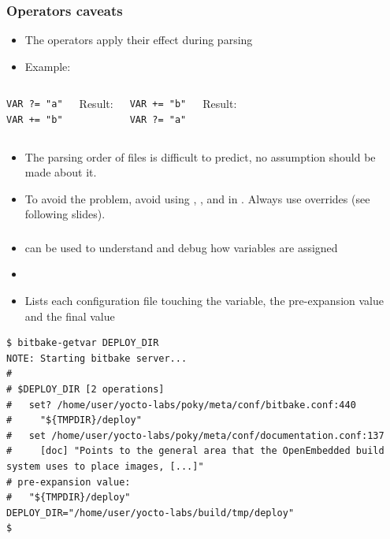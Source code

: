 \begin{frame}[fragile]
  \frametitle{Operators caveats}
  \begin{itemize}
    \item The operators apply their effect during parsing
    \item Example:
  \end{itemize}
  \begin{columns}
    \begin{block}{}
      \begin{verbatim}
VAR ?= "a"
VAR += "b"
      \end{verbatim}
    \end{block}
    Result: 
    \break
    \begin{block}{}
      \begin{verbatim}
VAR += "b"
VAR ?= "a"
      \end{verbatim}
    \end{block}
    Result: 
    \break
  \end{columns}

  \begin{itemize}
    \item The parsing order of files is difficult to predict, no assumption
      should be made about it.
    \item To avoid the problem, avoid using \code{+=}, \code{=+}, 
      and  in . Always use
      overrides (see following slides).
  \end{itemize}
\end{frame}

\begin{frame}[fragile]
  \frametitle{}
  \begin{itemize}
    \item {} can be used to understand and debug
      how variables are assigned
    \item {}
    \item Lists each configuration file touching the variable, the
      pre-expansion value and the final value
  \end{itemize}
  \begin{block}{}
    \begin{verbatim}
$ bitbake-getvar DEPLOY_DIR
NOTE: Starting bitbake server...
#
# $DEPLOY_DIR [2 operations]
#   set? /home/user/yocto-labs/poky/meta/conf/bitbake.conf:440
#     "${TMPDIR}/deploy"
#   set /home/user/yocto-labs/poky/meta/conf/documentation.conf:137
#     [doc] "Points to the general area that the OpenEmbedded build system uses to place images, [...]"
# pre-expansion value:
#   "${TMPDIR}/deploy"
DEPLOY_DIR="/home/user/yocto-labs/build/tmp/deploy"
$
    \end{verbatim}
  \end{block}
\end{frame}

